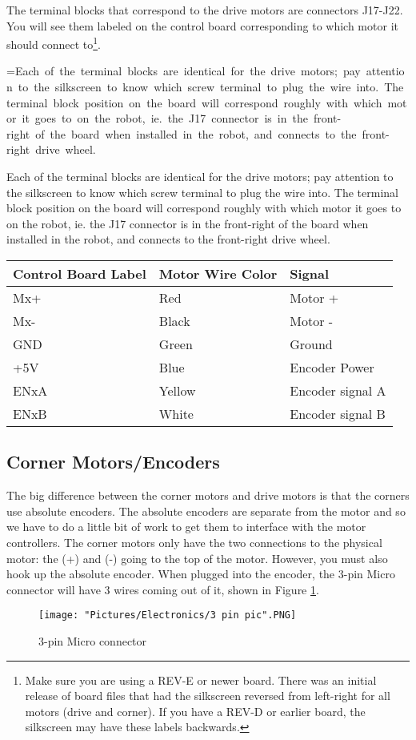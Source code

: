 \documentclass{article}
\makeatletter
\newcommand{\mybox}[1]{%
  \setbox0=\hbox{#1}%
  \setlength{\@tempdima}{\dimexpr\wd0+13pt}%
  \begin{tcolorbox}[colframe=mycolor,boxrule=0.5pt,arc=4pt,
      left=6pt,right=6pt,top=6pt,bottom=6pt,boxsep=0pt,width=0.95\textwidth]
    #1
  \end{tcolorbox}
}
\makeatother
\begin{document}
The terminal blocks that correspond to the drive motors are connectors J17-J22. You will see them labeled on the control board corresponding to which motor it should connect to\footnote{Make sure you are using a REV-E or newer board.  There was an initial release of board files that had the silkscreen reversed from left-right for all motors (drive and corner). If you have a REV-D or earlier board, the silkscreen may have these labels backwards.}.

\mybox{Each of the terminal blocks are identical for the drive motors; pay attention to the silkscreen to know which screw terminal to plug the wire into. The terminal block position on the board will correspond roughly with which motor it goes to on the robot, ie. the J17 connector is in the front-right of the board when installed in the robot, and connects to the front-right drive wheel. }

\begin{tabular}[3] {| l | l | l |}
	\hline
	\textbf{Control Board Label} & \textbf{Motor Wire Color} & \textbf{Signal} \\ \hline
	Mx+ & Red & Motor + \\ \hline
	Mx- & Black & Motor - \\ \hline
	GND & Green & Ground \\ \hline
	+5V & Blue & Encoder Power \\ \hline
	ENxA & Yellow & Encoder signal A \\ \hline
	ENxB & White & Encoder signal B \\ \hline
	\hline
\end{tabular}


\subsection{Corner Motors/Encoders}
The big difference between the corner motors and drive motors is that the corners use absolute encoders. The absolute encoders are separate from the motor and so we have to do a little bit of work to get them to interface with the motor controllers. The corner motors only have the two connections to the physical motor: the (+) and (-) going to the top of the motor. However, you must also hook up the absolute encoder. When plugged into the encoder, the 3-pin Micro connector will have 3 wires coming out of it, shown in Figure \ref{3pin}.

\bigskip 

\begin{figure}[H]
 	\centering
	\texttt{[image: "Pictures/Electronics/3 pin pic".PNG]}
 	\caption{3-pin Micro connector}
	\label{3pin}
\end{figure}
\end{document}
